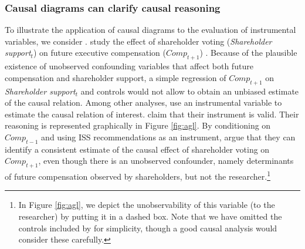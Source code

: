 \documentclass[12pt,reqno,titlepage]{amsart}
\begin{document}
\begin{doublespace}
\subsubsection{Causal diagrams can clarify causal reasoning}
To illustrate the application of causal diagrams to the evaluation of instrumental variables, we consider \citet{Armstrong:2013io}.
%
\citet{Armstrong:2013io} study the effect of shareholder voting (\textit{Shareholder support}$_{t}$) on future executive compensation ($\textit{Comp}_{t+1}$) .
Because of the plausible existence of unobserved confounding variables that affect both future compensation and shareholder support, a simple regression of $\textit{Comp}_{t+1}$ on \textit{Shareholder support}$_{t}$ and controls would not allow \citet{Armstrong:2013io} to obtain an unbiased estimate of the causal relation.
Among other analyses, \citet{Armstrong:2013io} use an instrumental variable to estimate the causal relation of interest.
\citet{Armstrong:2013io} claim that their instrument is valid. Their reasoning is represented graphically in Figure \ref{fig:agl}.
By conditioning on $\textit{Comp}_{t-1}$ and using ISS recommendations as an instrument, \citet{Armstrong:2013io} argue that they can identify a consistent estimate of the causal effect of shareholder voting on $\textit{Comp}_{t+1}$, even though there is an unobserved confounder, namely determinants of future compensation observed by shareholders, but not the researcher.\footnote{
In Figure \ref{fig:agl}, we depict the unobservability of this variable (to the researcher) by putting it in a dashed box.
Note that we have omitted the controls included by \citet{Armstrong:2013io} for simplicity, though a good causal analysis would consider these carefully.}


\end{doublespace}
\end{document}
